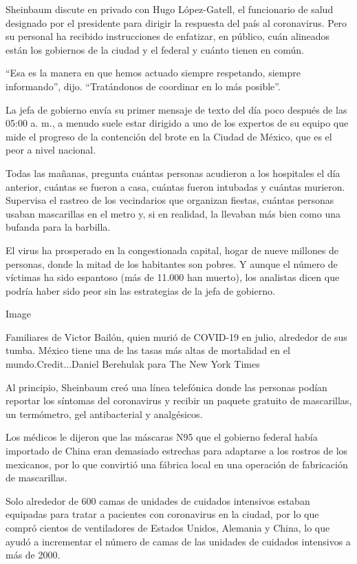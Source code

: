 Sheinbaum discute en privado con Hugo López-Gatell, el funcionario de
salud designado por el presidente para dirigir la respuesta del país al
coronavirus. Pero su personal ha recibido instrucciones de enfatizar, en
público, cuán alineados están los gobiernos de la ciudad y el federal y
cuánto tienen en común.

``Esa es la manera en que hemos actuado siempre respetando, siempre
informando'', dijo. ``Tratándonos de coordinar en lo más posible''.

La jefa de gobierno envía su primer mensaje de texto del día poco
después de las 05:00 a. m., a menudo suele estar dirigido a uno de los
expertos de su equipo que mide el progreso de la contención del brote en
la Ciudad de México, que es el peor a nivel nacional.

Todas las mañanas, pregunta cuántas personas acudieron a los hospitales
el día anterior, cuántas se fueron a casa, cuántas fueron intubadas y
cuántas murieron. Supervisa el rastreo de los vecindarios que organizan
fiestas, cuántas personas usaban mascarillas en el metro y, si en
realidad, la llevaban más bien como una bufanda para la barbilla.

El virus ha prosperado en la congestionada capital, hogar de nueve
millones de personas, donde la mitad de los habitantes son pobres. Y
aunque el número de víctimas ha sido espantoso (más de 11.000 han
muerto), los analistas dicen que podría haber sido peor sin las
estrategias de la jefa de gobierno.

Image

Familiares de Victor Bailón, quien murió de COVID-19 en julio, alrededor
de sus tumba. México tiene una de las tasas más altas de mortalidad en
el mundo.Credit...Daniel Berehulak para The New York Times

Al principio, Sheinbaum creó una línea telefónica donde las personas
podían reportar los síntomas del coronavirus y recibir un paquete
gratuito de mascarillas, un termómetro, gel antibacterial y analgésicos.

Los médicos le dijeron que las máscaras N95 que el gobierno federal
había importado de China eran demasiado estrechas para adaptarse a los
rostros de los mexicanos, por lo que convirtió una fábrica local en una
operación de fabricación de mascarillas.

Solo alrededor de 600 camas de unidades de cuidados intensivos estaban
equipadas para tratar a pacientes con coronavirus en la ciudad, por lo
que compró cientos de ventiladores de Estados Unidos, Alemania y China,
lo que ayudó a incrementar el número de camas de las unidades de
cuidados intensivos a más de 2000.

